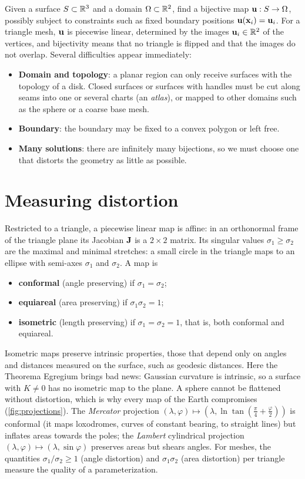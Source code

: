 Given a surface $S\subset\mathbb{R}^3$ and a domain $\Omega\subset\mathbb{R}^2$, find a bijective map
$\mathbf{u}:S\to\Omega$, possibly subject to constraints such as fixed boundary positions
$\mathbf{u}(\mathbf{x}_i)=\mathbf{u}_i$. For a triangle mesh, $\mathbf{u}$ is piecewise linear, determined by the images
$\mathbf{u}_i\in\mathbb{R}^2$ of the vertices, and bijectivity means that no triangle is flipped and that the
images do not overlap. Several difficulties appear immediately:
\begin{itemize}
  \item \textbf{Domain and topology}: a planar region can only receive surfaces with the topology of
  a disk. Closed surfaces or surfaces with handles must be cut along seams into one or several
  charts (an \emph{atlas}), or mapped to other domains such as the sphere or a coarse base mesh.
  \item \textbf{Boundary}: the boundary may be fixed to a convex polygon or left free.
  \item \textbf{Many solutions}: there are infinitely many bijections, so we must choose one that
  distorts the geometry as little as possible.
\end{itemize}

\section{Measuring distortion}

Restricted to a triangle, a piecewise linear map is affine: in an orthonormal frame of the triangle
plane its Jacobian $\mathbf{J}$ is a $2\times2$ matrix. Its singular values $\sigma_1\ge\sigma_2$ are the
maximal and minimal stretches: a small circle in the triangle maps to an ellipse with semi-axes
$\sigma_1$ and $\sigma_2$. A map is
\begin{itemize}
  \item \textbf{conformal} (angle preserving) if $\sigma_1=\sigma_2$;
  \item \textbf{equiareal} (area preserving) if $\sigma_1\sigma_2=1$;
  \item \textbf{isometric} (length preserving) if $\sigma_1=\sigma_2=1$, that is, both conformal and
  equiareal.
\end{itemize}
Isometric maps preserve intrinsic properties, those that depend only on angles and distances
measured on the surface, such as geodesic distances. Here the Theorema Egregium brings bad news:
Gaussian curvature is intrinsic, so a surface with $K\neq0$ has no isometric map to the plane. A
sphere cannot be flattened without distortion, which is why every map of the Earth compromises
(\cref{fig:projections}). The \emph{Mercator} projection
$(\lambda,\varphi)\mapsto(\lambda,\ln\tan(\tfrac\pi4+\tfrac\varphi2))$ is conformal (it maps
loxodromes, curves of constant bearing, to straight lines) but inflates areas towards the poles; the
\emph{Lambert} cylindrical projection $(\lambda,\varphi)\mapsto(\lambda,\sin\varphi)$ preserves
areas but shears angles. For meshes, the quantities $\sigma_1/\sigma_2\ge1$ (angle distortion) and
$\sigma_1\sigma_2$ (area distortion) per triangle measure the quality of a parameterization.

